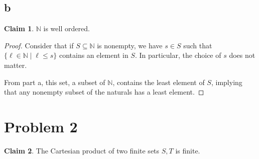 \documentclass[12pt,letterpaper]{article}
\theoremstyle{definition}
\newtheorem*{claim}{Claim}
\newcommand{\N}{\mathbb{N}}
\begin{document}
\subsection*{b}

\begin{claim}
    $\N$ is well ordered.
\end{claim}

\begin{proof}
    Consider that if $S \subseteq \N$ is nonempty,
    we have $s \in S$ such that $\{\ell \in \N \mid \ell \leq s\}$ contains an element in $S$.
    In particular, the choice of $s$ does not matter.

    From part a, this set, a subset of $\N$, contains the least element of $S$, implying that any nonempty
    subset of the naturals has a least element.
\end{proof}

\section*{Problem 2}
\begin{claim}
    The Cartesian product of two finite sets $S,T$ is finite.
\end{claim}
\end{document}
